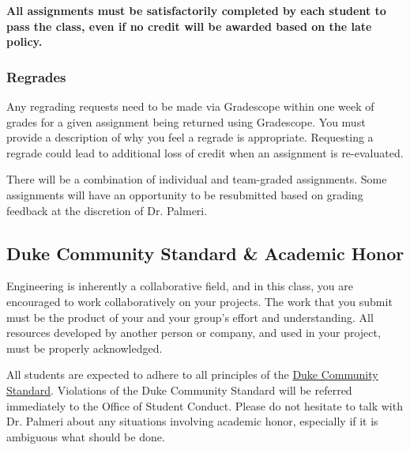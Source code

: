 \documentclass[10pt]{report}
\begin{document}
\textbf{All assignments must be satisfactorily completed by each student to pass
the class, even if no credit will be awarded based on the late policy.}

\subsubsection*{Regrades}
Any regrading requests need to be made via Gradescope within one week of grades for a given
assignment being returned using Gradescope. You
 must provide a description of
why you feel a regrade is appropriate. Requesting a
 regrade could lead to
additional loss of credit when an assignment is re-evaluated.

There will be a combination of individual and team-graded assignments. Some assignments will have an opportunity to be
resubmitted based on grading feedback at the discretion of Dr. Palmeri.

\subsection*{Duke Community Standard \& Academic Honor}
Engineering is inherently a collaborative field, and in this class, you are
encouraged to work collaboratively on your projects. The
 work that you submit
must be the product of your and your group’s effort and understanding. All
resources developed by another person or company, and used in your project,
must be properly acknowledged.

All students are expected to adhere to all principles of the
\href{https://trinity.duke.edu/undergraduate/academic-policies/community-standard-student-conduct}{Duke
Community Standard}. Violations of the Duke Community
 Standard will be referred
immediately to the Office of Student Conduct. Please do not hesitate to talk
with Dr. Palmeri about any
 situations involving academic honor, especially if
it is ambiguous what should be done.
\end{document}
